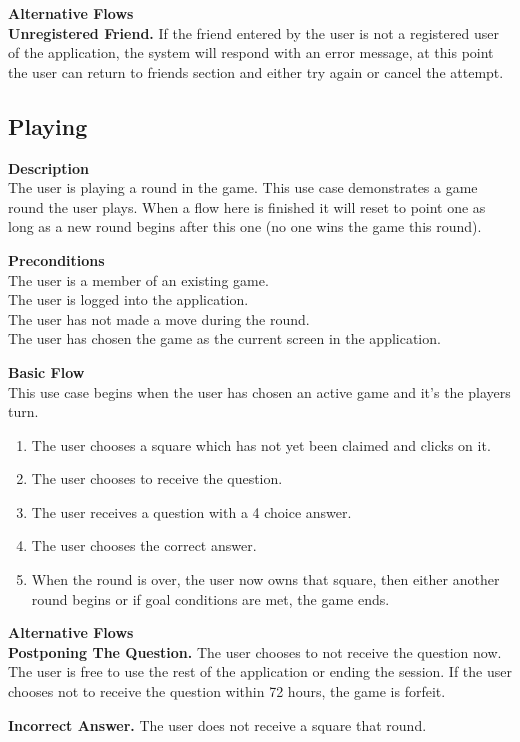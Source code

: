 \bigskip\textbf{Alternative Flows}\\[1\baselineskip]
\textbf{Unregistered Friend.}
If the friend entered by the user is not a registered user of the application, the system will respond with an error message, at this point the user can return to friends section and either try again or cancel the attempt.


\subsection{Playing}
\textbf{Description}\\
The user is playing a round in the game.
This use case demonstrates a game round the user plays. When a flow here is finished it will reset to point one as long as a new round begins after this one (no one wins the game this round).

\textbf{Preconditions}\\
The user is a member of an existing game.\\
The user is logged into the application.\\
The user has not made a move during the round.\\
The user has chosen the game as the current screen in the application.

\textbf{Basic Flow}\\
This use case begins when the user has chosen an active game and it's the players turn.
\begin{enumerate}
	\item The user chooses a square which has not yet been claimed and clicks on it.
	\item The user chooses to receive the question.
	\item The user receives a question with a 4 choice answer.
	\item The user chooses the correct answer.
	\item When the round is over, the user now owns that square, then either another round begins or if goal conditions are met, the game ends.
\end{enumerate}

\bigskip\textbf{Alternative Flows}\\[1\baselineskip]
\textbf{Postponing The Question.}
The user chooses to not receive the question now.
The user is free to use the rest of the application or ending the session.
If the user chooses not to receive the question within 72 hours, the game is forfeit.

\textbf{Incorrect Answer.}
The user does not receive a square that round.

